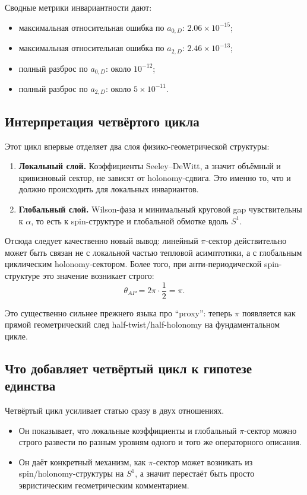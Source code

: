 \documentclass[12pt,a4paper]{article}
\begin{document}
Сводные метрики инвариантности дают:
\begin{itemize}
    \item максимальная относительная ошибка по \(a_{0,D}\): \(2.06\times 10^{-15}\);
    \item максимальная относительная ошибка по \(a_{2,D}\): \(2.46\times 10^{-13}\);
    \item полный разброс по \(a_{0,D}\): около \(10^{-12}\);
    \item полный разброс по \(a_{2,D}\): около \(5\times 10^{-11}\).
\end{itemize}

\subsection{Интерпретация четвёртого цикла}

Этот цикл впервые отделяет два слоя физико-геометрической структуры:
\begin{enumerate}
    \item \textbf{Локальный слой.} Коэффициенты Seeley--DeWitt, а значит объёмный и кривизновый сектор, не зависят от holonomy-сдвига. Это именно то, что и должно происходить для локальных инвариантов.
    \item \textbf{Глобальный слой.} Wilson-фаза и минимальный круговой gap чувствительны к \(\alpha\), то есть к spin-структуре и глобальной обмотке вдоль \(S^1\).
\end{enumerate}

Отсюда следует качественно новый вывод: линейный \(\pi\)-сектор действительно может быть связан не с локальной частью тепловой асимптотики, а с глобальным циклическим holonomy-сектором. Более того, при анти-периодической spin-структуре это значение возникает строго:
\[
\theta_{AP}=2\pi\cdot \frac{1}{2}=\pi.
\]

Это существенно сильнее прежнего языка про ``proxy'': теперь \(\pi\) появляется как прямой геометрический след half-twist/half-holonomy на фундаментальном цикле.

\subsection{Что добавляет четвёртый цикл к гипотезе единства}

Четвёртый цикл усиливает статью сразу в двух отношениях.
\begin{itemize}
    \item Он показывает, что локальные коэффициенты и глобальный \(\pi\)-сектор можно строго развести по разным уровням одного и того же операторного описания.
    \item Он даёт конкретный механизм, как \(\pi\)-сектор может возникать из spin/holonomy-структуры на \(S^1\), а значит перестаёт быть просто эвристическим геометрическим комментарием.
\end{itemize}
\end{document}
